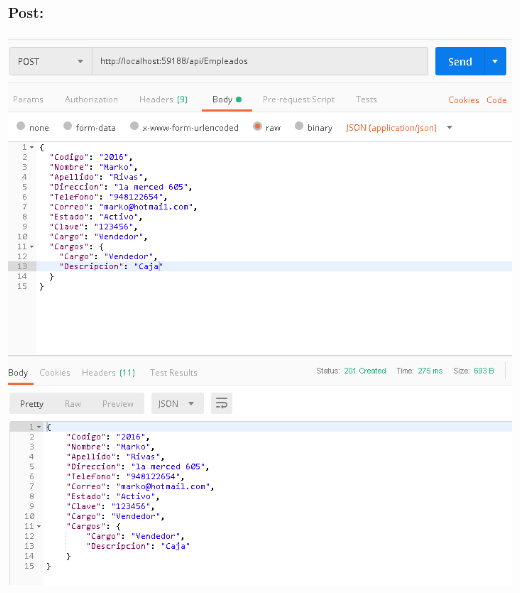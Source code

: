 \begin{flushleft}
\textbf{}\\
\textbf{}\\
\textbf{}\\
\textbf{}\\
\textbf{Post:}\\
\begin{center}
	\includegraphics[width=19cm]{./Imagenes/post4} 
	\end{center}
\textbf{}\\


\end{flushleft}
